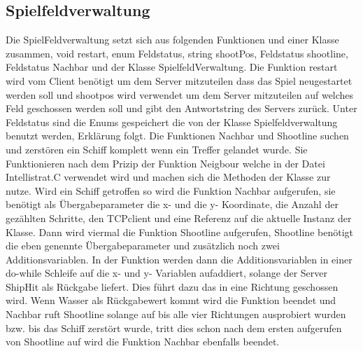 \subsection{Spielfeldverwaltung}

Die SpielFeldverwaltung setzt sich aus folgenden Funktionen und einer Klasse zusammen,
void restart, enum Feldstatus, string shootPos, Feldstatus shootline, Feldstatus Nachbar und der Klasse SpielfeldVerwaltung.
Die Funktion restart wird vom Client benötigt um dem Server mitzuteilen dass das Spiel neugestartet werden soll und shootpos wird verwendet um dem Server mitzuteilen auf welches Feld 
geschossen werden soll und gibt den Antwortstring des Servers zurück. Unter Feldstatus sind die Enums gespeichert die von der Klasse Spielfeldverwaltung benutzt werden, Erklärung 
folgt. Die Funktionen Nachbar und Shootline suchen und zerstören ein Schiff komplett wenn ein Treffer gelandet wurde. Sie Funktionieren nach dem Prizip der Funktion Neigbour welche 
in der Datei Intellistrat.C verwendet wird und machen sich die Methoden der Klasse zur nutze. Wird ein Schiff getroffen so wird die Funktion Nachbar aufgerufen, sie benötigt als 
Übergabeparameter die x- und die y- Koordinate, die Anzahl der gezählten Schritte, den TCPclient und eine Referenz auf die aktuelle Instanz der Klasse. Dann wird viermal die Funktion 
Shootline aufgerufen, Shootline benötigt die eben genennte Übergabeparameter und zusätzlich noch zwei Additionsvariablen. In der Funktion werden dann die Additionsvariablen in einer 
do-while Schleife auf die x- und y- Variablen aufaddiert, solange der Server ShipHit als Rückgabe liefert. Dies führt dazu das in eine Richtung geschossen wird. Wenn Wasser als 
Rückgabewert kommt wird die Funktion beendet und Nachbar ruft Shootline solange auf bis alle vier Richtungen ausprobiert wurden bzw. bis das Schiff zerstört wurde, tritt dies schon 
nach dem ersten aufgerufen von Shootline auf wird die Funktion Nachbar ebenfalls beendet.

